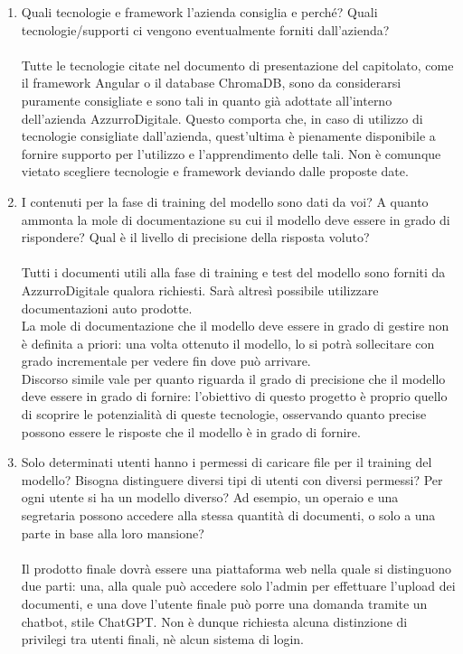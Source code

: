 \documentclass[12pt]{article}
\begin{document}
\begin{enumerate}
    \item Quali tecnologie e framework l’azienda consiglia e perché? Quali tecnologie/supporti ci vengono eventualmente forniti dall’azienda?\\ \\
Tutte le tecnologie citate nel documento di presentazione del capitolato, come il framework Angular o il database ChromaDB, sono da considerarsi puramente consigliate e sono tali in quanto già adottate all'interno dell'azienda AzzurroDigitale. Questo comporta che, in caso di utilizzo di tecnologie consigliate dall'azienda, quest'ultima è pienamente disponibile a fornire supporto per l'utilizzo e l'apprendimento delle tali. Non è comunque vietato scegliere tecnologie e framework deviando dalle proposte date.
    \item I contenuti per la fase di training del modello sono dati da voi? A quanto ammonta la mole di documentazione su cui il modello deve essere in grado di rispondere? Qual è il livello di precisione della risposta voluto? \\ \\
Tutti i documenti utili alla fase di training e test del modello sono forniti da AzzurroDigitale qualora richiesti. Sarà altresì possibile utilizzare documentazioni auto prodotte.\\
La mole di documentazione che il modello deve essere in grado di gestire non è definita a priori: una volta ottenuto il modello, lo si potrà sollecitare con grado incrementale per vedere fin dove può arrivare.\\
Discorso simile vale per quanto riguarda il grado di precisione che il modello deve essere in grado di fornire: l'obiettivo di questo progetto è proprio quello di scoprire le potenzialità di queste tecnologie, osservando quanto precise possono essere le risposte che il modello è in grado di fornire.
    \item Solo determinati utenti hanno i permessi di caricare file per il training del modello? Bisogna distinguere diversi tipi di utenti con diversi permessi? Per ogni utente si ha un modello diverso? Ad esempio, un operaio e una segretaria possono accedere alla stessa quantità di documenti, o solo a una parte in base alla loro mansione?\\ \\
Il prodotto finale dovrà essere una piattaforma web nella quale si distinguono due parti: una, alla quale può accedere solo l'admin per effettuare l'upload dei documenti, e una dove l'utente finale può porre una domanda tramite un chatbot, stile ChatGPT. Non è dunque richiesta alcuna distinzione di privilegi tra utenti finali, nè alcun sistema di login.

\end{enumerate}
\end{document}
